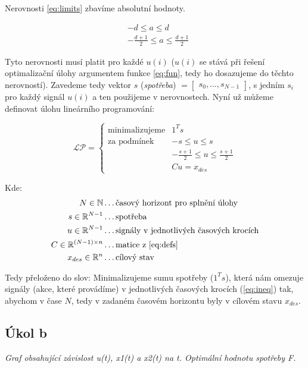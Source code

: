 \documentclass[10pt,a4paper,openright]{article}
\begin{document}
Nerovnosti \ref{eq:limits} zbavíme absolutní hodnoty.


\begin{equation}\label{eq:ineq}
	\begin{split}
	&-d \leq a \leq d\\
	&-\frac{d+1}{2} \leq a \leq \frac{d+1}{2}
	\end{split}
\end{equation}

Tyto nerovnosti musí platit pro každé $u(i)$ ($u(i)$ se stává při řešení optimalizační úlohy 
argumentem funkce \ref{eq:fun}, tedy ho dosazujeme do těchto nerovností). Zavedeme tedy vektor
$s$ (\textit{spotřeba}) $= \begin{bmatrix}s_0,\hdots,s_{N-1} \end{bmatrix}$,
s jedním $s_i$ pro každý signál $u(i)$ a ten použijeme v nerovnostech. Nyní už můžeme
definovat úlohu lineárního programování:

\begin{equation}
	\mathcal{LP} = 
	\begin{cases}
		\text{minimalizujeme} & 1^Ts\\
		\text{za podmínek} & -s \leq u \leq s\\
		& -\frac{s+1}{2} \leq u \leq \frac{s+1}{2}\\
		& Cu = x_{des}
	\end{cases}
\end{equation}

Kde:
\begin{equation}
	\begin{split}
		N \in \mathbb{N} & \hdots \text{časový horizont pro splnění úlohy}\\
		s \in \mathbb{R}^{N-1} & \hdots \text{spotřeba}\\
		u \in \mathbb{R}^{N-1} & \hdots \text{signály v jednotlivých časových krocích}\\
		C \in \mathbb{R}^{(N-1) \times n} & \hdots \text{matice z \ref{eq:defs}} \\
		x_{des} \in \mathbb{R}^{n} & \hdots \text{cílový stav}
	\end{split}
\end{equation}

Tedy přeloženo do slov: Minimalizujeme sumu spotřeby ($1^Ts$), 
která nám omezuje signály (akce, které provádíme) v jednotlivých časových krocích (\ref{eq:ineq}) 
tak, abychom v čase $N$, tedy v zadaném časovém horizontu byly v cílovém stavu $x_{des}$.


\subsection{Úkol b}

\textit{Graf obsahující závislost u(t), x1(t) a x2(t) na t. Optimální hodnotu spotřeby F.}
\vspace{.4cm}
\end{document}
